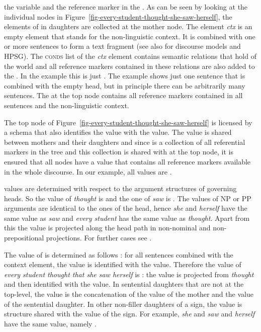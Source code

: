 \documentclass[output=paper
 	        ,biblatex
                ,babelshorthands
                ,newtxmath
                ,draftmode
                ,colorlinks, citecolor=brown
]{langscibook}
\begin{document}
the variable  and the reference marker  in the \listlu. As can be seen by looking at the
individual nodes in Figure~\ref{fig-every-student-thought-she-saw-herself}, the elements of \listlu
in daughters are collected at the mother node. The element \emph{ctx} is an empty element that
stands for the non-linguistic context. It is combined with one or more sentences to form a text
fragment (see also  for discourse models and HPSG). The \textsc{conds}
list of the \emph{ctx} element contains semantic relations that hold of the world and all reference
markers contained in these relations are also added to the \listlul. In the example this is just
. The example shows just one sentence that is combined with the empty head, but in principle
there can be arbitrarily many sentences. The \listlul at the top node contains all reference markers contained in
all sentences and the non-linguistic context. 

The top node of Figure~\ref{fig-every-student-thought-she-saw-herself} is licensed by a schema that
also identifies the \listu value with the \listlu value. The \listu value is shared between mothers
and their daughters and since \listlu is a collection of all referential markers in the tree and
this collection is shared with \listu at the top node, it is ensured that all nodes have a \listu
value that contains all reference markers available in the whole discourse. In our example, all
\listu values are .

\lista values are determined with respect to the argument structures of governing heads. So the
\lista value of \emph{thought} is  and the one of \emph{saw} is
. The \lista values of NP or PP arguments are identical to the ones of the head,
hence \emph{she} and \emph{herself} have the same \lista value as \emph{saw} and \emph{every
  student} has the same \lista value as \emph{thought}. Apart from this the \lista value is
projected along the head path in non-nominal and non-prepositional projections. For further cases
see \citet[]{Branco2002a}.

The value of \listz is determined as follows \citep[]{Branco2002a}: for all sentences combined with the context element,
the \listz value is identified with the \lista value. Therefore the \listz value of \emph{every
  student thought that she saw herself} is : the \lista value is
projected from \emph{thought} and then identified with the \listz value. In sentential daughters
that are not at the top-level, the \listz value is the concatenation of the \listz value of the
mother and the \lista value of the sentential daughter. In other non-filler daughters of a sign, the
\listz value is structure shared with the \listz value of the sign. For example, \emph{she} and
\emph{saw} and \emph{herself} have the same \listz value, namely .
\end{document}

